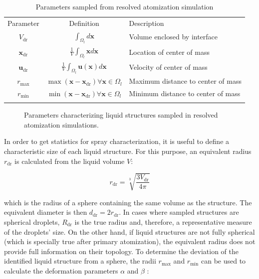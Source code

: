 \begin{table}[!h]
\centering
\caption{Parameters sampled from resolved atomization simulation}
\begin{tabular}{ccl}
\thickhline
Parameter & Definition & Description \\
\thickhline
$V_\mathrm{dr}$ & $\displaystyle \int_{\Omega_l} d \textbf{x}$ & Volume enclosed by interface  \\
\hline
$\textbf{x}_\mathrm{dr}$ & $\displaystyle \frac{1}{V} \int_{\Omega_l} \boldsymbol{x} d \textbf{x}$ &   Location of center of mass \\
\hline
$\textbf{u}_\mathrm{dr}$ & $\displaystyle \frac{1}{V} \int_{\Omega_l} \textbf{u} \left( \boldsymbol{x} \right) d \textbf{x}$ & Velocity of center of mass  \\
\hline
$r_\mathrm{max}$ & $\displaystyle \max \left( \textbf{x} - \textbf{x}_\mathrm{dr}  \right) \forall \textbf{x} \in \Omega_l$ & Maximum distance to center of mass \\
\hline
$r_\mathrm{min}$ & $\displaystyle \min \left( \textbf{x} - \textbf{x}_\mathrm{dr}  \right) \forall \textbf{x} \in \Omega_l$ & Minimum distance to center of mass \\
\thickhline
\end{tabular}
\label{tab:sampling_parameters}
\end{table}

\begin{figure}[h!]	
	\centering
	\caption{Parameters characterizing liquid structures sampled in resolved atomization simulations. }
	\label{fig:droplet_sampling_parameters}
\end{figure}

In order to get statistics for spray characterization, it is useful to define a characteristic size of each liquid structure. For this purpose, an equivalent radius $r_\mathrm{dr}$ is calculated from the liquid volume $V$:

\begin{equation}
\label{eq:ch4_r_equivalent_calculation}
r_\mathrm{dr} = \sqrt[3]{\frac{3 V_\mathrm{dr}}{4 \pi}}
\end{equation}

which is the radius of a sphere containing the same volume as the structure. The equivalent diameter is then $d_\mathrm{dr} = 2 r_\mathrm{dr}$. In cases where sampled structures are spherical droplets, $R_\mathrm{dr}$ is the true radius and, therefore, a representative measure of the droplets' size. On the other hand, if liquid structures are not fully spherical (which is specially true after primary atomization), the equivalent radius does not provide full information on their topology. To determine the deviation of the identified liquid structure from a sphere, the radii $r_\mathrm{max}$ and $r_\mathrm{min}$ can be used to calculate the deformation parameters $\alpha$ and $\beta$ :

